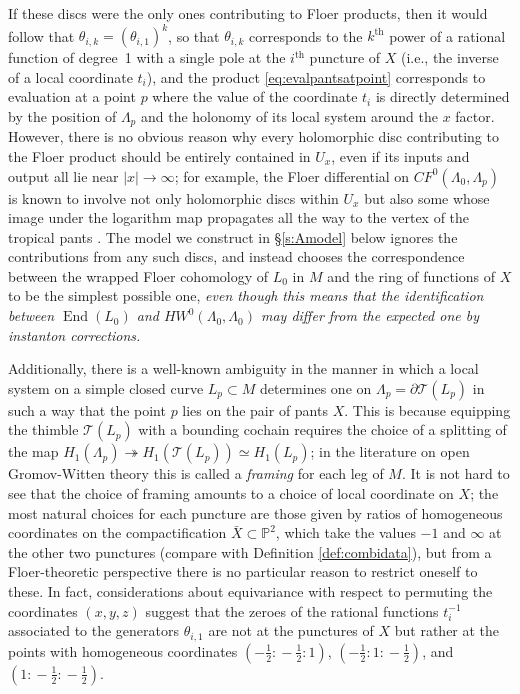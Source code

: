 \documentclass[11pt,leqno]{amsart}
\numberwithin{equation}{section}
\def\PP{{\mathbb P}}
\def\End{\operatorname{End}}
\begin{document}
If these discs were the only ones contributing to Floer products, then it
would follow that $\theta_{i,k}=(\theta_{i,1})^{k}$, so that
$\theta_{i,k}$ corresponds to the $k^\text{th}$ power of a rational function of 
degree~1 with a single pole at the $i^\text{th}$ puncture of $X$ (i.e., the 
inverse of a local coordinate $t_i$), and the product
\eqref{eq:evalpantsatpoint} corresponds to evaluation at a point $p$
where the value of the coordinate $t_i$ is directly
determined by the position of 
$\Lambda_p$ and the holonomy of its local system around the $x$ factor.
However, there is no obvious reason why every holomorphic disc contributing
to the Floer product should be entirely contained in $U_x$, even if its inputs
and output all lie near $|x|\to\infty$; for example, the Floer differential
on $CF^0(\Lambda_0,\Lambda_p)$ is known to involve not only holomorphic
discs within $U_x$ but also some whose
image under the logarithm map propagates all the way to the vertex of the 
tropical pants \cite{Hicks}. The model we construct in \S \ref{s:Amodel}
below ignores the contributions from any such discs, and instead
chooses the correspondence between the wrapped Floer cohomology of
$L_0$ in $M$ and the ring of functions of $X$ to be the simplest possible one,
{\em even though this means that the identification between $\End(L_0)$ and
$HW^0(\Lambda_0,\Lambda_0)$ may differ from the expected one by instanton
corrections.}

Additionally, there is a well-known ambiguity in the manner in which a local system
on a simple closed curve $L_p\subset M$ determines one on $\Lambda_p=
\partial\mathcal{T}(L_p)$ in such a way that the point $p$ lies on the pair of 
pants $X$. This is because equipping the thimble $\mathcal{T}(L_p)$
with a bounding cochain requires the choice of a splitting of the
map $H_1(\Lambda_p)\twoheadrightarrow H_1(\mathcal{T}(L_p))\simeq H_1(L_p)$;
in the literature on open Gromov-Witten theory this is called a 
{\em framing} for each leg of $M$. It is not hard to see that the choice of
framing amounts to a choice of local coordinate on $X$; the most natural
choices for each puncture are those given by ratios of homogeneous coordinates
on the compactification $\bar{X}\subset \PP^2$, which take the values $-1$ and
$\infty$ at the other two punctures (compare with Definition \ref{def:combidata}), but 
from a Floer-theoretic perspective there is no particular reason to
restrict oneself to these. In fact, considerations about equivariance with
respect to permuting the coordinates $(x,y,z)$ suggest that the zeroes of the
rational functions $t_i^{-1}$ associated to the generators $\theta_{i,1}$
are not at the punctures of $X$ but rather at the points with homogeneous
coordinates $(-\frac12\!:\!-\frac12\!:\!1)$, 
$(-\frac12\!:\!1\!:\!-\frac12)$, and $(1\!:\!-\frac12\!:\!-\frac12)$.
\end{document}
